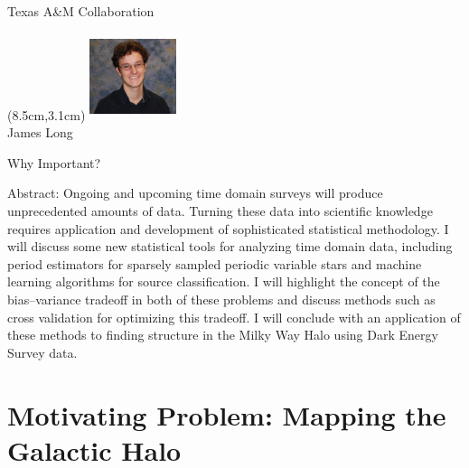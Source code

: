 \documentclass[12pt]{beamer}
\newcommand{\w}{1in}
\newcommand{\h}{1in}
\begin{document}
\begin{frame}{Texas A\&M Collaboration}
  \begin{textblock*}{3cm}(8.5cm,3.1cm) %
\includegraphics[width=\w,height=\h]{figs/long.jpg}\\
James Long
\end{textblock*}


\end{frame}


\begin{frame}{Why Important?}

  Abstract: Ongoing and upcoming time domain surveys will produce
unprecedented amounts of data. Turning these data into scientific
knowledge requires application and development of sophisticated
statistical methodology. I will discuss some new statistical tools for
analyzing time domain data, including period estimators for sparsely
sampled periodic variable stars and machine learning algorithms for
source classification. I will highlight the concept of the
bias--variance tradeoff in both of these problems and discuss methods
such as cross validation for optimizing this tradeoff. I will conclude
with an application of these methods to finding structure in the Milky
Way Halo using Dark Energy Survey data.



  \end{frame}



\section{Motivating Problem: Mapping the Galactic Halo}
\end{document}

